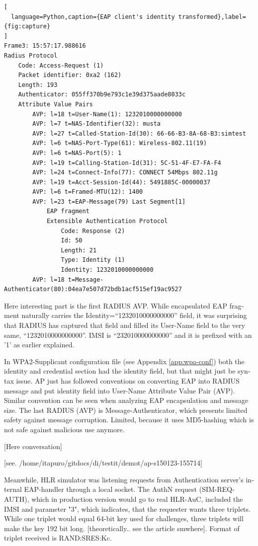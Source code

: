\documentclass[12pt,a4paper,english]{tutthesis}
\begin{document}
\begin{otherlanguage}{english}
\begin{lstlisting}[
  language=Python,caption={EAP client's identity transformed},label={fig:capture}
]
Frame3: 15:57:17.988616
Radius Protocol
    Code: Access-Request (1)
    Packet identifier: 0xa2 (162)
    Length: 193
    Authenticator: 055ff370b9e793c1e39d375aade8033c
    Attribute Value Pairs
        AVP: l=18 t=User-Name(1): 1232010000000000
        AVP: l=7 t=NAS-Identifier(32): musta
        AVP: l=27 t=Called-Station-Id(30): 66-66-B3-8A-68-B3:simtest
        AVP: l=6 t=NAS-Port-Type(61): Wireless-802.11(19)
        AVP: l=6 t=NAS-Port(5): 1
        AVP: l=19 t=Calling-Station-Id(31): 5C-51-4F-E7-FA-F4
        AVP: l=24 t=Connect-Info(77): CONNECT 54Mbps 802.11g
        AVP: l=19 t=Acct-Session-Id(44): 5491885C-00000037
        AVP: l=6 t=Framed-MTU(12): 1400
        AVP: l=23 t=EAP-Message(79) Last Segment[1]
            EAP fragment
            Extensible Authentication Protocol
                Code: Response (2)
                Id: 50
                Length: 21
                Type: Identity (1)
                Identity: 1232010000000000
        AVP: l=18 t=Message-Authenticator(80):04ea7e507d72bdb1acf515ef19ac9527
\end{lstlisting}
\normalsize


Here interesting part is the first RADIUS AVP.
While encapsulated EAP fragment naturally carries the Identity=``1232010000000000''
field, it was surprising that RADIUS has captured that field and 
filled its User-Name field to the very same, ``1232010000000000''. 
IMSI is ``232010000000000'' and it is prefixed with
an '1' as earlier explained.

In WPA2-Supplicant configuration file (see Appendix \ref{app:wpa-conf}) both the identity and
credential section had the identity field, but that might 
just be syntax issue.
AP just has followed conventions on converting
EAP into RADIUS message and put identity field into User-Name
Attribute Value Pair (AVP).
Similar convention can be seen when analyzing EAP encapsulation and
message size. The last RADIUS (AVP) is 
Message-Authenticator, which presents limited safety against message 
corruption. Limited, because it uses MD5-hashing which is not safe
against malicious use anymore.

[Here conversation]



[see. /home/itapuro/gitdocs/di/testit/demot/ap-s150123-155714]

Meanwhile, HLR simulator was listening requests from Authentication
server's internal EAP-handler through a local socket.
The AuthN request (SIM-REQ-AUTH), which in production version would go
to real HLR-AuC, included the IMSI and parameter
"3", which indicates, that the requester wants three triplets. 
While one triplet would equal 64-bit key used for challenges, three
triplets will make the key 192 bit long. [theoretically.. see the
article smwhere].  Format of triplet received is RAND:SRES:Kc.


\end{otherlanguage}
\end{document}
